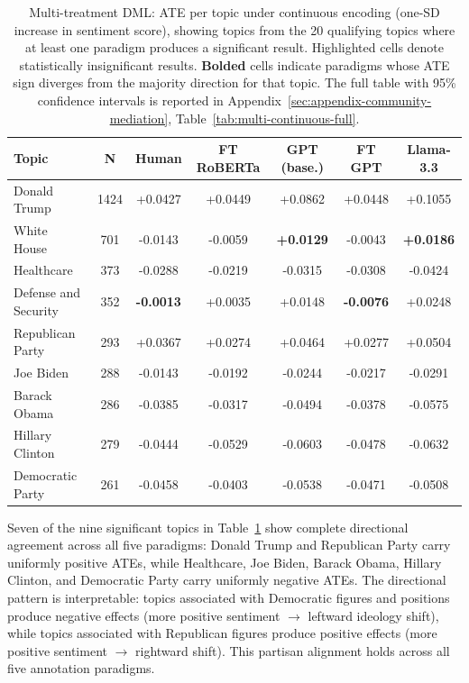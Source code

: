 \begin{table}[ht]
  \centering
  \setlength{\tabcolsep}{4pt}
  \small
  \begin{tabular}{l c
      S[table-format=+1.4]
      S[table-format=+1.4]
      S[table-format=+1.4]
      S[table-format=+1.4]
      S[table-format=+1.4]}
    \toprule
    \textbf{Topic} & {\textbf{N}}
      & {\textbf{Human}}
      & {\textbf{FT RoBERTa}}
      & {\textbf{GPT (base.)}}
      & {\textbf{FT GPT}}
      & {\textbf{Llama-3.3}} \\
    \midrule
    Donald Trump & 1424 & +0.0427 & +0.0449 & +0.0862 & +0.0448 & +0.1055 \\
    White House & 701 & -0.0143 & -0.0059 & \textbf{+0.0129} & -0.0043 & \textbf{+0.0186} \\
    Healthcare & 373 & -0.0288 & -0.0219 & -0.0315 & -0.0308 & -0.0424 \\
    Defense and Security & 352 & \textbf{-0.0013} & +0.0035 & +0.0148 & \textbf{-0.0076} & +0.0248 \\
    Republican Party & 293 & +0.0367 & +0.0274 & +0.0464 & +0.0277 & +0.0504 \\
    Joe Biden & 288 & -0.0143 & -0.0192 & -0.0244 & -0.0217 & -0.0291 \\
    Barack Obama & 286 & -0.0385 & -0.0317 & -0.0494 & -0.0378 & -0.0575 \\
    Hillary Clinton & 279 & -0.0444 & -0.0529 & -0.0603 & -0.0478 & -0.0632 \\
    Democratic Party & 261 & -0.0458 & -0.0403 & -0.0538 & -0.0471 & -0.0508 \\
    \bottomrule
  \end{tabular}
  \caption{Multi-treatment DML: ATE per topic under continuous encoding (one-SD increase in sentiment score), showing topics from the 20 qualifying topics where at least one paradigm produces a significant result. \colorbox{blue!15}{Highlighted} cells denote statistically insignificant results. \textbf{Bolded} cells indicate paradigms whose ATE sign diverges from the majority direction for that topic. The full table with 95\% confidence intervals is reported in Appendix~\ref{sec:appendix-community-mediation}, Table~\ref{tab:multi-continuous-full}.}
  \label{tab:multi-continuous}
\end{table}

Seven of the nine significant topics in Table~\ref{tab:multi-continuous} show complete directional agreement across all five paradigms: Donald Trump and Republican Party carry uniformly positive ATEs, while Healthcare, Joe Biden, Barack Obama, Hillary Clinton, and Democratic Party carry uniformly negative ATEs. The directional pattern is interpretable: topics associated with Democratic figures and positions produce negative effects (more positive sentiment $\to$ leftward ideology shift), while topics associated with Republican figures produce positive effects (more positive sentiment $\to$ rightward shift). This partisan alignment holds across all five annotation paradigms.

